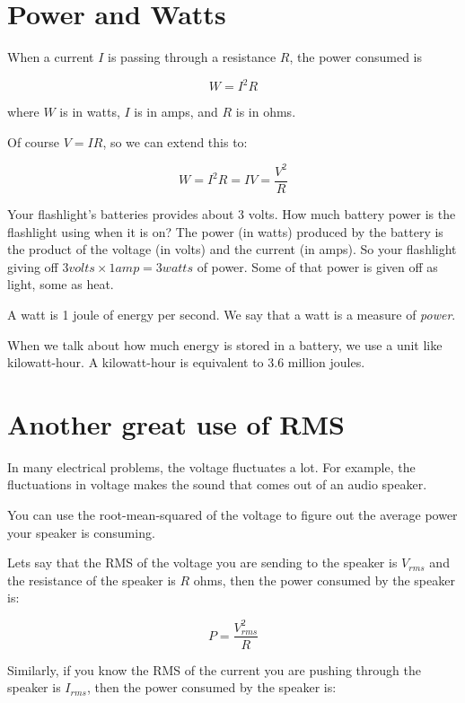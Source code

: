 \section{Power and Watts}

\begin{mdframed}[style=important, frametitle={Joule's Law}]

  When a current $I$ is passing through a resistance $R$, the power consumed is
  
  $$W = I^2 R$$

  where $W$ is in watts, $I$ is in amps, and $R$ is in ohms.
\end{mdframed}

Of course $V = IR$, so we can extend this to:

$$W = I^2 R = I V = \frac{V^2}{R}$$

Your flashlight's batteries provides about 3 volts. How much
battery power is the flashlight using when it is on? The power (in
watts) produced by the battery is the product of the voltage (in
volts) and the current (in amps). So your flashlight giving off $3
volts \times 1 amp = 3 watts$ of power. Some of that power is given
off as light, some as heat.

A watt is 1 joule of energy per second. We say that a watt is a
measure of \textit{power}.

When we talk about how much energy is stored in a battery, we use a
unit like kilowatt-hour. A kilowatt-hour is equivalent to 3.6 million
joules.

\section{Another great use of RMS}

In many electrical problems, the voltage fluctuates a lot.  For
example, the fluctuations in voltage makes the sound that comes out of an
audio speaker.

You can use the root-mean-squared of the voltage to figure out the average power
your speaker is consuming.

Lets say that the RMS of the voltage you are sending to the speaker is $V_{rms}$
and the resistance of the speaker is $R$ ohms, then the power consumed
by the speaker is:

$$P = \frac{V_{rms}^2}{R}$$

Similarly, if you know the RMS of the current you are pushing through
the speaker is $I_{rms}$, then the power consumed by the speaker is:

